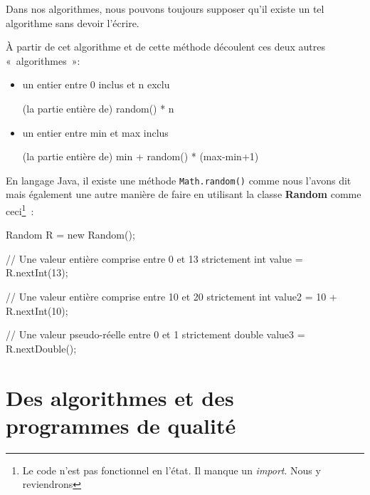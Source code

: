 			Dans nos algorithmes, nous pouvons toujours supposer qu'il existe un
			tel algorithme sans devoir l'écrire. 

			\begin{center}
			\end{center}
			
			À partir de cet algorithme et de cette méthode découlent ces deux
			autres «~algorithmes~»:

			\begin{itemize}
				\item un entier entre 0 inclus et n exclu

					\begin{langagenaturel}
						(la partie entière de) random() * n
					\end{langagenaturel}

				\item un entier entre min et max inclus

					\begin{langagenaturel}
						(la partie entière de) min + random() * (max-min+1)
					\end{langagenaturel}
			
			\end{itemize}

			En langage Java, il existe une méthode \verb_Math.random()_ comme
			nous l'avons dit mais également une autre manière de faire en
			utilisant la classe \textbf{Random} comme ceci\footnote{Le code
			n'est pas fonctionnel en l'état. Il manque un \textit{import}.
			Nous y reviendrons}~: 

			\begin{java}
Random R = new Random();

// Une valeur entière comprise entre 0 et 13 strictement
int value = R.nextInt(13);

// Une valeur entière comprise entre 10 et 20 strictement
int value2 = 10 + R.nextInt(10);

// Une valeur pseudo-réelle entre 0 et 1 strictement
double value3 = R.nextDouble();
			\end{java}
			

	\section{Des algorithmes et des programmes de qualité}
	
